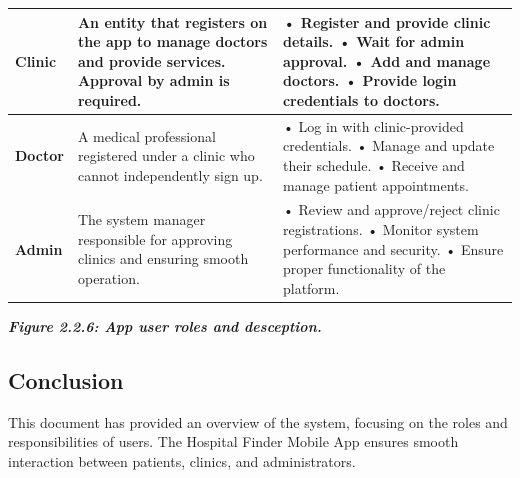 \documentclass[12pt]{report}
\begin{document}
\begin{longtable}{|p{3cm}|p{6cm}|p{6cm}|}
	\hspace*{0.9cm}\textbf{Clinic}                                                                             &
	An entity that registers on the app to manage doctors and provide services. Approval by admin is required. &
	• Register and provide clinic details.\newline
	• Wait for admin approval.\newline
	• Add and manage doctors.\newline
	• Provide login credentials to doctors.                                                                                                                                                                                               \\
	\hline


	\hspace*{0.85cm}\textbf{Doctor}                                                                            & A medical professional registered under a clinic who cannot independently sign up.  &
	• Log in with clinic-provided credentials.\newline
	• Manage and update their schedule.\newline
	• Receive and manage patient appointments.                                                                                                                                                                                            \\
	\hline

	\hspace*{0.85cm}\textbf{Admin}                                                                             & The system manager responsible for approving clinics and ensuring smooth operation. &
	• Review and approve/reject clinic registrations.\newline
	• Monitor system performance and security.\newline
	• Ensure proper functionality of the platform.                                                                                                                                                                                        \\
	\hline
	
\end{longtable}
\begin{center}
	\textit{\textbf{Figure 2.2.6: App user roles and desception.}}
\end{center}


\subsection{Conclusion}
This document has provided an overview of the system, focusing on the roles and responsibilities of users. The Hospital Finder Mobile App ensures smooth interaction between patients, clinics, and administrators.
\vspace{0.5cm}
\end{document}
